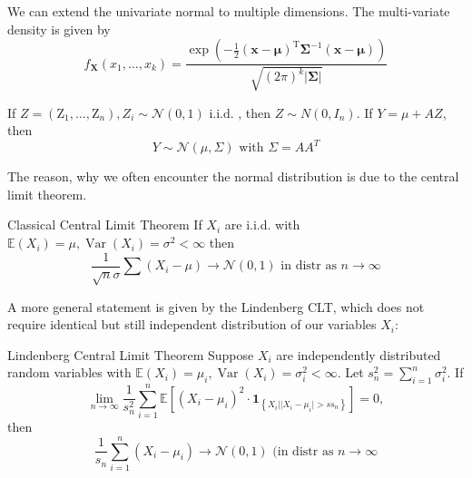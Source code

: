 \documentclass[11pt, %
	oneside, %
	english, %
	onehalfspacing, %
	]{article} %
\numberwithin{equation}{section}
\begin{document}
We can extend the univariate normal to multiple dimensions.
The multi-variate density is given by
\begin{equation*}
    f_{\mathbf{X}}\left(x_1, \ldots, x_k\right)=\frac{\exp \left(-\frac{1}{2}(\mathbf{x}-\mathbf{\mu})^{\mathrm{T}} \mathbf{\Sigma}^{-1}(\mathbf{x}-\mathbf{\mu})\right)}{\sqrt{(2 \pi)^k|\mathbf{\Sigma}|}}
\end{equation*}

If $Z=\left(\mathrm{Z}_1, \ldots, \mathrm{Z}_n\right), Z_i \sim \mathcal{N}(0,1) \text { i.i.d. }$, then  $Z \sim N\left(0, I_n\right)$. If $Y=\mu+A Z$, then
\begin{equation*}
    Y \sim \mathcal{N}(\mu, \Sigma) \text { with } \Sigma=A A^T
\end{equation*}

The reason, why we often encounter the normal distribution is due to the central limit theorem.

\begin{theorem}{Classical Central Limit Theorem}{}
    If $X_i$ are i.i.d. with $\mathbb{E}\left(X_i\right)=\mu, \operatorname{Var}\left(X_i\right)=\sigma^2<\infty$ then
    \begin{equation*}
        \frac{1}{\sqrt{n} \sigma} \sum \left(X_i-\mu\right) \rightarrow \mathcal{N}(0,1) \text{ in distr as } n \rightarrow \infty
    \end{equation*}
\end{theorem}

A more general statement is given by the Lindenberg CLT, which does not require identical but still independent distribution of our variables $X_i$:

\begin{theorem}{Lindenberg Central Limit Theorem}{}
    Suppose $X_i$ are  independently distributed random variables with $\mathbb{E}\left(X_i\right)=\mu_i, \operatorname{Var}\left(X_i\right)=\sigma_i^2<\infty$.
    Let $s_n^2=\sum_{i=1}^n \sigma_i^2$. If
    \begin{equation*}
        \lim _{n \rightarrow \infty} \frac{1}{s_n^2} \sum_{i=1}^n \mathbb{E}\left[\left(X_i-\mu_i\right)^2 \cdot \mathbf{1}_{\left\{X_i| | X_i-\mu_i \mid>s s_n\right\}}\right]=0,
    \end{equation*}
    then
    \begin{equation*}
        \frac{1}{s_n} \sum_{i=1}^n\left(X_i-\mu_i\right) \rightarrow \mathcal{N}(0,1) \text { (in distr as } n \rightarrow \infty
    \end{equation*}
\end{theorem}
\end{document}
